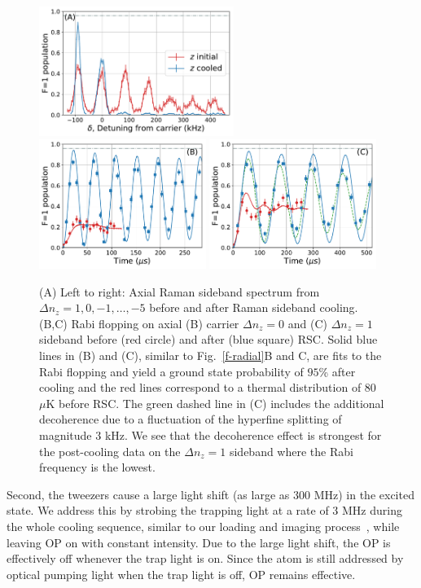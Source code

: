 \documentclass[aps,prl,twocolumn,groupedaddress]{revtex4-1}
\begin{document}
\begin{figure}
  \includegraphics[height=4.2cm]{spectrum_az.pdf}
  \includegraphics[height=4.2cm]{rabi_flop_az_0.pdf}
  \includegraphics[height=4.2cm]{rabi_flop_az_p1.pdf}
  \caption{(A) Left to right: Axial Raman sideband spectrum from $\Delta n_z=1,0,-1,\ldots,-5$
    before and after Raman sideband cooling.
    (B,C) Rabi flopping on axial (B) carrier $\Delta n_z=0$  and (C) $\Delta n_z=1$ sideband
    before (red circle) and after (blue square) RSC.
    Solid blue lines in (B) and (C), similar to Fig.~\ref{f-radial}B and C,
    are fits to the Rabi flopping and yield a ground state probability of $95$\%
    after cooling and
    the red lines correspond to a thermal distribution of $80$ $\mu$K before RSC.
    The green dashed line in (C) includes the additional decoherence due to
    a fluctuation of the hyperfine splitting of magnitude $3$ kHz.
    We see that the decoherence effect is strongest for the post-cooling data on
    the $\Delta n_z=1$ sideband where the Rabi frequency is the lowest.
    \label{f-axial}}
\end{figure}

Second, the tweezers cause a large light shift (as large as $300$ MHz) in the excited state.
We address this by strobing the trapping light at a rate of 3 MHz
during the whole cooling sequence,
similar to our loading and imaging process~\cite{Hutzler2017-LightShifts},
while leaving OP on with constant intensity.
Due to the large light shift, the OP is effectively off whenever the trap light is on.
Since the atom is still addressed by optical pumping light when the trap light is off,
OP remains effective.
\end{document}
